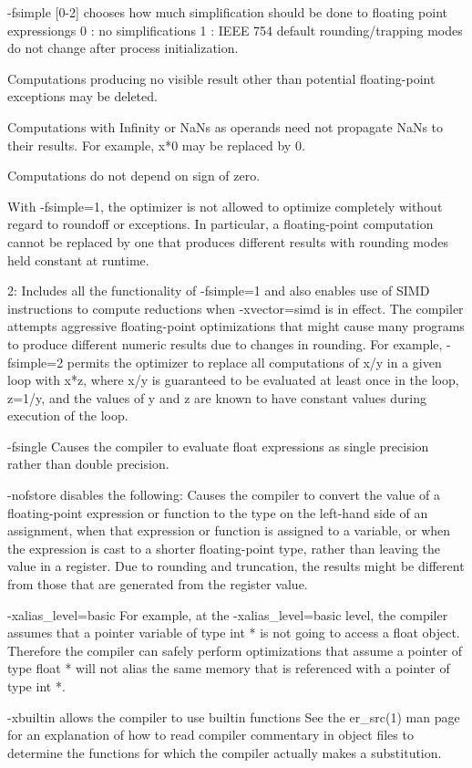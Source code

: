 -fsimple [0-2] chooses how much simplification should be done to floating point expressiongs
0 : no simplifications
1 : IEEE 754 default rounding/trapping modes do not change after process initialization.

Computations producing no visible result other than potential floating-point exceptions may be deleted.

Computations with Infinity or NaNs as operands need not propagate NaNs to their results. For example, x*0 may be replaced by 0.

Computations do not depend on sign of zero.

With -fsimple=1, the optimizer is not allowed to optimize completely without regard to roundoff or exceptions. In particular, a floating-point computation cannot be replaced by one that produces different results with rounding modes held constant at runtime.

2: 
Includes all the functionality of -fsimple=1 and also enables use of SIMD instructions to compute reductions when -xvector=simd is in effect.
The compiler attempts aggressive floating-point optimizations that might cause many programs to produce different numeric results due to changes in rounding. For example, -fsimple=2 permits the optimizer to replace all computations of x/y in a given loop with x*z, where x/y is guaranteed to be evaluated at least once in the loop, z=1/y, and the values of y and z are known to have constant values during execution of the loop.

-fsingle Causes the compiler to evaluate float expressions as single precision rather than double precision.

-nofstore disables the following:
Causes the compiler to convert the value of a floating-point expression or function to the type on the left-hand side of an assignment, when that expression or function is assigned to a variable, or when the expression is cast to a shorter floating-point type, rather than leaving the value in a register. Due to rounding and truncation, the results might be different from those that are generated from the register value.

-xalias_level=basic 
For example, at the -xalias_level=basic level, the compiler assumes that a pointer variable of type int * is not going to access a float object. Therefore the compiler can safely perform optimizations that assume a pointer of type float * will not alias the same memory that is referenced with a pointer of type int *.

-xbuiltin allows the compiler to use builtin functions
 See the er_src(1) man page for an explanation of how to read compiler commentary in object files to determine the functions for which the compiler actually makes a substitution.
 
